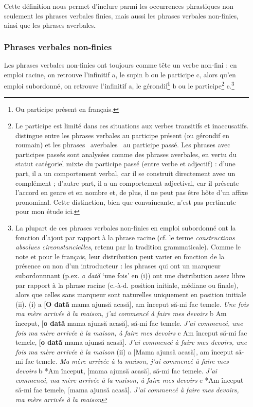 Cette définition nous permet d'inclure parmi les occurrences phrastiques non seulement les phrases verbales finies, mais aussi les phrases verbales non-finies, ainsi que les phrases averbales. 

\subsubsection{Phrases verbales non-finies} 
Les phrases verbales non-finies ont toujours comme tête un verbe non-fini : en emploi racine, on retrouve l'infinitif a, le supin b ou le participe c, alors qu'en emploi subordonné, on retrouve l'infinitif a, le gérondif\footnote{Ou participe présent en français.} b ou le participe\footnote{Le participe est limité dans ces situations aux verbes transitifs et inaccusatifs. \citet{Mouret2011} distingue entre les phrases verbales au participe présent (ou gérondif en roumain) et les phrases {\guillemotleft}~averbales~{\guillemotright} au participe passé. Les phrases avec participes passés sont analysées comme des phrases averbales, en vertu du statut catégoriel mixte du participe passé (entre verbe et adjectif) : d'une part, il a un comportement verbal, car il se construit directement avec un complément ; d'autre part, il a un comportement adjectival, car il présente l'accord en genre et en nombre et, de plus, il ne peut pas être hôte d'un affixe pronominal. Cette distinction, bien que convaincante, n'est pas pertinente pour mon étude ici.}  c.\footnote{La plupart de ces phrases verbales non-finies en emploi subordonné ont la fonction d'ajout par rapport à la phrase racine (cf. le terme \textit{constructions absolues circonstancielles}, retenu par la tradition grammaticale). Comme le note \citet{Laurens2007} et \citet{Mouret2011} pour le français, leur distribution peut varier en fonction de la présence ou non d'un introducteur : les phrases qui ont un marqueur subordonnnant (p.ex. \textit{o dată} `une fois' en (i)) ont une distribution assez libre par rapport à la phrase racine (c.-à-d. position initiale, médiane ou finale), alors que celles sans marqueur sont naturelles uniquement en position initiale (ii).
(i)  a  [\textbf{O dată} mama ajunsă acasă], am început să-mi fac temele.
    \textit{Une fois ma mère arrivée à la maison, j'ai commencé à faire mes devoirs}
  b  Am început, [\textbf{o dată} mama ajunsă acasă], să-mi fac temele.
    \textit{J'ai commencé, une fois ma mère arrivée à la maison, à faire mes devoirs}
  c  Am început să-mi fac temele, [\textbf{o dată} mama ajunsă acasă]. 
    \textit{J'ai commencé à faire mes devoirs, une fois ma mère arrivée à la maison}
(ii)  a  [Mama ajunsă acasă], am început să-mi fac temele.
    \textit{Ma mère arrivée à la maison, j'ai commencé à faire mes devoirs}
  b  *Am început, [mama ajunsă acasă], să-mi fac temele.
    \textit{J'ai commencé, ma mère arrivée à la maison, à faire mes devoirs}
  c  *Am început să-mi fac temele, [mama ajunsă acasă]. 
    \textit{J'ai commencé à faire mes devoirs, ma mère arrivée à la maison}}


